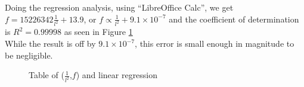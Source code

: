 \documentclass[a4paper,12pt]{article}
\begin{document}
    Doing the regression analysis, using ``LibreOffice Calc'', we get $f=15226342\frac{1}{l^{2}}+13.9$, or $f\propto\frac{1}{l^{2}}+9.1\times10^{-7}$ and the coefficient of determination is $R^{2}=0.99998$ as seen in Figure \ref{fig:regression}\\
    While the result is off by $9.1\times10^{-7}$, this error is small enough in magnitude to be negligible.
    \begin{figure}[H]%
    \begin{center}

    \caption{Table of ($\frac{1}{l^{2}}$,$f$) and linear regression}\label{fig:regression}
    \end{center}
    \end{figure}
\end{document}
